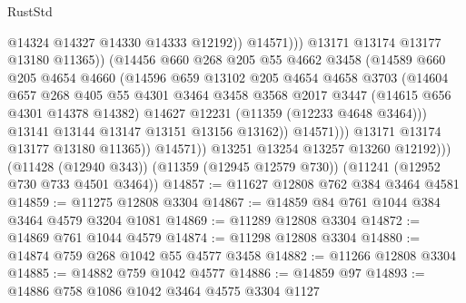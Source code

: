 \begin{lexlean}{RustStd}
\begin{coremodule}
{{{{{{{{{{{{{{{{{{{                                    @14324
                                    @14327
                                    @14330
                                    @14333
                                    @12192))
                                @14571)))
                          @13171
                          @13174
                          @13177
                          @13180
                          @11365))
                      (@14456
                        @660
                        @268
                        @205
                        @55
                        @4662
                        @3458
                        (@14589
                          @660
                          @205
                          @4654
                          @4660
                          (@14596
                            @659
                            @13102
                            @205
                            @4654
                            @4658
                            @3703
                            (@14604
                              @657
                              @268
                              @405
                              @55
                              @4301
                              @3464
                              @3458
                              @3568
                              @2017
                              @3447
                              (@14615 @656 @4301 @14378 @14382)
                              @14627
                              @12231
                              (@11359 (@12233 @4648 @3464)))
                            @13141
                            @13144
                            @13147
                            @13151
                            @13156
                            @13162))
                        @14571)))
                  @13171
                  @13174
                  @13177
                  @13180
                  @11365))
              @14571))
          @13251
          @13254
          @13257
          @13260
          @12192)))
    (@11428 (@12940 @343))
    (@11359 (@12945 @12579 @730))
    (@11241 (@12952 @730 @733 @4501 @3464))
@14857 := @11627 @12808 @762 @384 @3464 @4581
@14859 := @11275 @12808 @3304
@14867 := @14859 @84 @761 @1044 @384 @3464 @4579 @3204 @1081
@14869 := @11289 @12808 @3304
@14872 := @14869 @761 @1044 @4579
@14874 := @11298 @12808 @3304
@14880 := @14874 @759 @268 @1042 @55 @4577 @3458
@14882 := @11266 @12808 @3304
@14885 := @14882 @759 @1042 @4577
@14886 := @14859 @97
@14893 := @14886 @758 @1086 @1042 @3464 @4575 @3304 @1127
}}}}}}}}}}}}}}}}}}}
\end{coremodule}
\end{lexlean}
